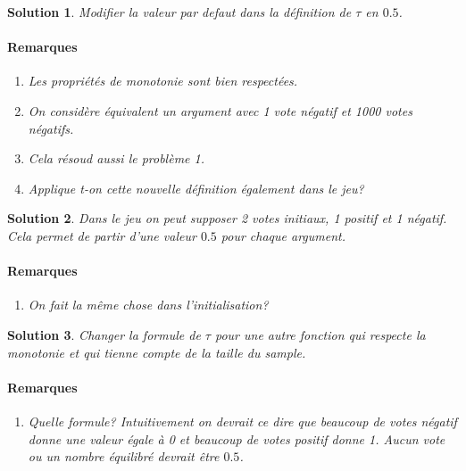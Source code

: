 \documentclass[12pt]{article}
\theoremstyle{defi}
\theoremstyle{not}
\theoremstyle{prob}
\newtheorem{solution}{Solution}[problem]
\begin{document}
  \begin{solution}
    Modifier la valeur par defaut dans la définition de $\tau$ en $0.5$.

    \paragraph{Remarques}
      \begin{enumerate}
        \item Les propriétés de monotonie sont bien respectées.
        \item On considère équivalent un argument avec 1 vote négatif et 1000 votes négatifs.
        \item Cela résoud aussi le problème 1.
        \item Applique t-on cette nouvelle définition également dans le jeu?
      \end{enumerate}
  \end{solution}

  \begin{solution}
    Dans le jeu on peut supposer 2 votes initiaux, 1 positif et 1 négatif. Cela permet de partir d'une valeur $0.5$ pour chaque argument.

    \paragraph{Remarques}
      \begin{enumerate}
        \item On fait la même chose dans l'initialisation?
      \end{enumerate}
  \end{solution}

  \begin{solution}
    Changer la formule de $\tau$ pour une autre fonction qui respecte la monotonie et qui tienne compte de la taille du sample.

    \paragraph{Remarques}
      \begin{enumerate}
        \item Quelle formule? Intuitivement on devrait ce dire que beaucoup de votes négatif donne une valeur égale à 0 et beaucoup de votes positif donne 1. Aucun vote ou un nombre équilibré devrait être $0.5$.
      \end{enumerate}
  \end{solution}
\color{black}
\end{document}
